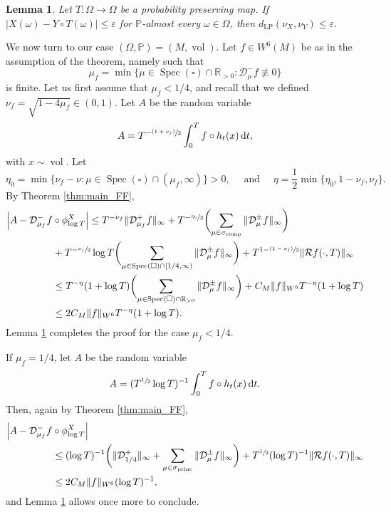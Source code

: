 \documentclass[10pt]{amsart}
\newcommand{\psfrac}[2]{\sfrac{(#1)}{#2}}
\newcommand \R{\mathbb{R}}
\newcommand*{\diff}{\mathop{}\!\mathrm{d}}
\newcommand{\Dm}[1]{\mathcal{D}_\mu^{-} #1}
\newcommand{\Dpm}[1]{\mathcal{D}_\mu^{\pm} #1}
\newcommand{\Levy}{d_{\levyy}}
\DeclareMathOperator{\vol}{vol}
\DeclareMathOperator{\Spec}{Spec}
\DeclareMathOperator{\comp}{comp}
\DeclareMathOperator{\princ}{princ}
\DeclareMathOperator{\levyy}{LP}
\newtheorem {lemma}[theorem]{Lemma}
\theoremstyle{definition}
\begin{document}
\begin{lemma}\label{lemma:levy}
Let $T \colon \Omega \to \Omega$ be a probability preserving map. If $|X(\omega) - Y\circ T(\omega)|\leq \varepsilon$ for $\mathbb{P}$-almost every $\omega \in \Omega$, then $\Levy(\nu_X, \nu_Y) \leq \varepsilon$.
\end{lemma}

We now turn to our case $(\Omega, \mathbb{P}) = (M, \vol)$.
Let $f \in W^6(M)$ be as in the assumption of the theorem, namely such that
\[
\mu_f = \min \{ \mu \in \Spec(\square) \cap \R_{>0} : \Dm{f} \not\equiv 0 \}
\]
is finite.
Let us first assume that $\mu_f <1/4$, and recall that we defined $\nu_f = \sqrt{1-4\mu_f} \in (0,1)$. Let $A$ be the random variable
\[
A = T^{-\psfrac{1+\nu_f}{2}} \int_0^T f \circ h_t(x) \diff t,
\]
with $x \sim \vol$.
Let
\[
\eta_0 = \min\{ \nu_f - \nu : \mu \in \Spec(\square) \cap (\mu_f, \infty) \} >0, \quad \text{ and } \quad \eta= \frac{1}{2} \min\{\eta_0, 1-\nu_f, \nu_f\}.
\]
By Theorem \ref{thm:main_FF},
\begin{align*}
\Bigl\lvert A - \mathcal{D}^{-}_{\mu_f} f&\circ \phi^X_{\log T} \Bigr\rvert \leq T^{- \nu_f} \|\mathcal{D}^{+}_{\mu_f} f\|_{\infty} + T^{- \sfrac{\eta_0}{2}} \biggl(\sum_{\mu \in \sigma_{\comp}} \|\Dpm{f} \|_{\infty} \biggr) \\
& + T^{- \sfrac{\nu_f}{2}} \log T \biggl(\sum_{\mu \in \Spec(\square) \cap [1/4, \infty)} \|\Dpm{f} \|_{\infty} \biggr) + T^{1-\psfrac{1-\nu_f}{2}} \|\mathcal{R}f(\cdot, T) \|_{\infty} \\
&\leq T^{-\eta} (1+\log T) \biggl(\sum_{\mu \in \Spec(\square) \cap \R_{>0}} \|\Dpm{f} \|_{\infty} \biggr) + C_M \|f\|_{W^6} T^{-\eta}(1+\log T)\\
&\leq 2C_M \|f\|_{W^6} T^{-\eta}(1+\log T).
\end{align*}
Lemma \ref{lemma:levy} completes the proof for the case $\mu_f < 1/4$.

If $\mu_f = 1/4$, let $A$ be the random variable
\[
A = (T^{\sfrac{1}{2}} \log T)^{-1} \int_0^T f \circ h_t(x) \diff t.
\]
Then, again by Theorem \ref{thm:main_FF},
\begin{align*}
\Bigl\lvert A - \mathcal{D}^{-}_{\mu_f} f &\circ \phi^X_{\log T} \Bigr\rvert\\
&\leq (\log T)^{-1} \biggl(\|\mathcal{D}^{+}_{1/4} \|_{\infty} + \sum_{\mu \in \sigma_{\princ}} \|\Dpm{f} \|_{\infty} \biggr) + T^{\sfrac{1}{2}} (\log T)^{-1} \|\mathcal{R}f(\cdot, T) \|_{\infty} \\
& \leq 2C_M \|f\|_{W^6} (\log T)^{-1},
\end{align*}
and Lemma \ref{lemma:levy} allows once more to conclude.
\end{document}
